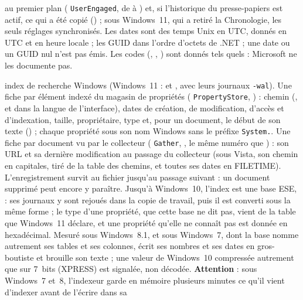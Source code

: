 \documentclass[11pt,a4paper,oneside]{report}
\begin{document}
\begin{description}[style=nextline,leftmargin=1.2em]
        au premier plan ( \texttt{UserEngaged}, de
         à ) et, si l'historique du
        presse-papiers est actif, ce qui a été copié
        () ; sous Windows~11, qui a retiré la
        Chronologie, les seuls réglages synchronisés. Les dates sont des temps
        Unix en UTC, donnés en UTC et en heure locale ; les GUID dans l'ordre
        d'octets de .NET ; une date ou un GUID nul n'est pas émis. Les codes
        (, ,
        ) sont donnés tels quels : Microsoft ne les
        documente pas.
  \item[\fichier{search\_index.json}] index de recherche Windows
        (Windows~11 :  et ,
        avec leurs journaux \texttt{-wal}). Une fiche par élément indexé du
        magasin de propriétés ( \texttt{PropertyStore},
        ) : chemin (, et
         dans la langue de l'interface), dates de
        création, de modification, d'accès et d'indexation, taille,
        propriétaire, type et, pour un document, le début de son texte
        () ; chaque propriété sous son nom Windows
        sans le préfixe \texttt{System.}. Une fiche par document vu par le
        collecteur ( \texttt{Gather}, , le
        même numéro que ) : son URL et sa dernière modification
        au passage du collecteur (sous Vista, son chemin  en
        capitales, tiré de la table des chemins, et toutes ses dates en
        FILETIME). L'enregistrement survit au fichier jusqu'au
        passage suivant : un document supprimé peut encore y paraître.
        Jusqu'à Windows~10, l'index est une base ESE,  :
        ses journaux y sont rejoués dans la copie de travail, puis il est
        converti sous la même forme ; le type d'une propriété, que cette base
        ne dit pas, vient de la table que Windows~11 déclare, et une propriété
        qu'elle ne connaît pas est donnée en hexadécimal. Mesuré sous
        Windows~8.1, et sous Windows~7, dont la base nomme autrement ses tables
        et ses colonnes, écrit ses nombres et ses dates en gros-boutiste et
        brouille son texte ; une valeur de Windows~10 compressée autrement que sur
        7~bits (XPRESS) est signalée, non décodée.
        \textbf{Attention} : sous Windows~7 et~8, l'indexeur garde en mémoire
        plusieurs minutes ce qu'il vient d'indexer avant de l'écrire dans sa

\end{description}
\end{document}
